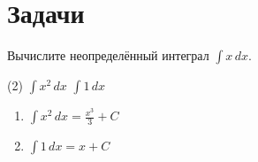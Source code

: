 \documentclass[homework, recordsfile=records.lua]{practice}
\begin{document}
\section*{Задачи}

\begin{exercise}
	Вычислите неопределённый интеграл $\int x \, dx$.
\end{exercise}

\begin{tasks}(2)
	\task $\int x^2 \, dx$
	\task $\int 1 \, dx$
\end{tasks}

\begin{solution}
	\begin{enumerate}
		\item $\int x^2 \, dx = \frac{x^3}{3} + C$
		\item $\int 1 \, dx = x + C$
	\end{enumerate}
\end{solution}
\end{document}
